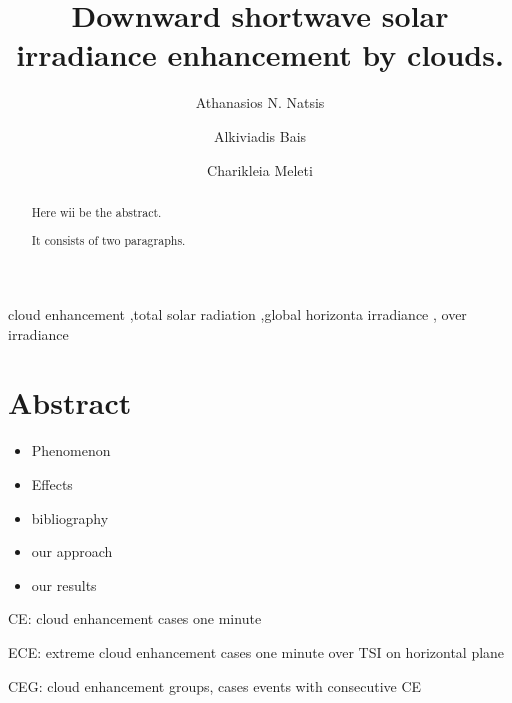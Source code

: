 \documentclass[preprint, 3p,
authoryear]{elsarticle} %
\providecommand{\tightlist}{%
  \setlength{\itemsep}{0pt}\setlength{\parskip}{0pt}}
\begin{document}
\begin{frontmatter}

  \title{Downward shortwave solar irradiance enhancement by clouds.}
    \author[LAP]{Athanasios N. Natsis%
  }
    \author[LAP]{Alkiviadis Bais%
  }
    \author[LAP]{Charikleia Meleti%
  }
  
  \begin{abstract}
  Here wii be the abstract.

  It consists of two paragraphs.
  \end{abstract}
    \begin{keyword}
    cloud enhancement \sep total solar radiation \sep global horizonta
irradiance \sep 
    over irradiance
  \end{keyword}
  
 \end{frontmatter}

\hypertarget{abstract}{%
\section*{Abstract}\label{abstract}}

\begin{itemize}
\tightlist
\item
  Phenomenon
\item
  Effects
\item
  bibliography
\item
  our approach
\item
  our results
\end{itemize}

CE: cloud enhancement cases one minute

ECE: extreme cloud enhancement cases one minute over TSI on horizontal
plane

CEG: cloud enhancement groups, cases events with consecutive CE
\end{document}
